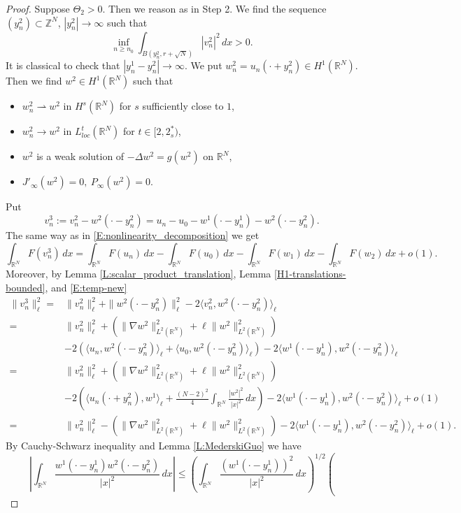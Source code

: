 \documentclass[12pt,leqno,twoside,sort]{amsart}
\newcommand{\R}{\mathbb{R}}
\newcommand{\Z}{\mathbb{Z}}
\newcommand{\weakto}{\rightharpoonup}
\numberwithin{equation}{section}
\begin{document}
\begin{proof}
Suppose $\Theta_2>0$. Then we reason as in Step 2. We find the sequence $(y_n^2)\subset \Z^N$, $|y_n^2|\to\infty$ such that 
$$
\inf_{n \geq n_0} \int_{B(y_n^2, r+\sqrt{N})} |v_n^2|^2 \, dx > 0.
$$ 
It is classical to check that $|y_n^1-y_n^2|\to\infty$. We put $w_n^2=u_n(\cdot+y_n^2)\in H^1(\R^N)$. Then we find $w^2\in H^1(\R^N)$ such that 
\begin{itemize}
\item $w_n^2\weakto w^2$ in $H^s(\R^N)$ for $s$ sufficiently close to $1$,
\item $w_n^2\to w^2$ in $L^t_{loc}(\R^N)$ for $t\in[2,2^*_s)$,
\item $w^2$ is a weak solution of $-\Delta w^2 =g(w^2)$ on $\R^N$,
\item $J'_\infty(w^2)=0, \ P_\infty(w^2)=0$.
\end{itemize}
Put 
\[
v_n^3:=v_n^2-w^2(\cdot - y_n^2)
=u_n-u_0-w^1(\cdot - y_n^1)-w^2(\cdot - y_n^2).
\]
The same way as in \eqref{E:nonlinearity_decomposition} we get
\[
\int_{\R^N} F(v_n^3) \, dx 
=\int_{\R^N} F(u_n)\,dx 
-\int_{\R^N} F(u_0)\,dx 
- \int_{\R^N} F(w_1)\,dx 
- \int_{\R^N} F(w_2)\,dx +o(1).
\]
Moreover, by Lemma \ref{L:scalar_product_translation}, Lemma \ref{H1-translations-bounded}, and \eqref{E:temp-new}
\[
\begin{split}
\|v_n^3\|^2_\ell=&\|v_n^2\|^2_\ell + \|w^2(\cdot - y_n^2)\|^2_\ell
-2\langle v_n^2, w^2(\cdot - y_n^2)\rangle_\ell\\
=& \|v_n^2\|^2_\ell 
+\left( \|\nabla w^2\|_{L^2 (\R^N)}^2 + \ell \| w^2 \|_{L^2 (\R^N)}^2 \right)\\
&-2\left( \langle u_n,w^2(\cdot - y_n^2)\rangle_\ell
+\langle u_0,w^2(\cdot - y_n^2)\rangle_\ell\right)
-2\langle w^1(\cdot - y_n^1),w^2(\cdot - y_n^2)\rangle_\ell
\\
=&\|v_n^2\|^2_\ell 
+\left( \|\nabla w^2\|_{L^2 (\R^N)}^2 + \ell \| w^2 \|_{L^2 (\R^N)}^2 \right)\\
&-2\left(\langle u_n(\cdot + y_n^2), w^1 \rangle_\ell
+\frac{(N-2)^2}4\int_{\R^N} \frac{|w^2|^2 }{|x|^2} \, dx\right)
-2\langle w^1(\cdot - y_n^1),w^2(\cdot - y_n^2)\rangle_\ell
+o(1)\\
=&\|v_n^2\|^2_\ell 
-\left( \|\nabla w^2\|_{L^2 (\R^N)}^2 + \ell \| w^2 \|_{L^2 (\R^N)}^2 \right)-2\langle w^1(\cdot - y_n^1),w^2(\cdot - y_n^2)\rangle_\ell+o(1).
\end{split}
\]
By Cauchy-Schwarz inequality and Lemma \ref{L:MederskiGuo} we have
\[
\left| \int_{\R^N} \frac{ w^1(\cdot - y_n^1)w^2(\cdot - y_n^2)}{|x|^2} \, dx \right| \leq \left(
\int_{\R^N} \frac{ (w^1(\cdot - y_n^1))^2}{|x|^2} \, dx \right)^{1/2} \left(
\]
\end{proof}
\end{document}
